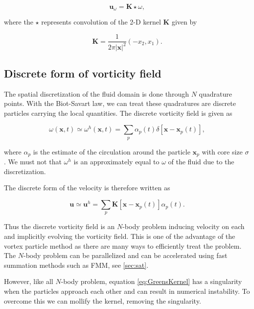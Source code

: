 	\begin{equation}
	\mathbf{u}_{\omega} = \mathbf{K}\star\omega,
	\end{equation}
	
where the $\star$ represents convolution of the 2-D kernel $\mathbf{K}$ given by

	\begin{equation}
	\mathbf{K} = \frac{1}{2\pi\left|\mathbf{x}\right|^2}\left(-x_2,x_1\right).
	\label{eq:GreensKernel}
	\end{equation}
	
\subsection{Discrete form of vorticity field}
The spatial discretization of the fluid domain is done through $N$ quadrature points. With the Biot-Savart law, we can treat these quadratures are discrete particles carrying the local quantities. The discrete vorticity field is given as

	\begin{equation}
	\omega\left(\mathbf{x},t\right) \simeq \omega^h\left(\mathbf{x},t\right) = \sum_{p}\alpha_p\left(t\right)\delta \left[\mathbf{x}-\mathbf{x}_p\left(t\right)\right],
	\end{equation}

where $\alpha_{p}$ is the estimate of the circulation around the particle $\mathbf{x}_p$ with core size $\sigma$. We must not that $\omega^h$ is an approximately equal to $\omega$ of the fluid due to the discretization.

The discrete form of the velocity is therefore written as

	\begin{equation}
	\mathbf{u} \simeq \mathbf{u}^h = \sum_p \mathbf{K}\left[\mathbf{x}-\mathbf{x}_p\left(t\right)\right]\alpha_p\left(t\right).
	\end{equation}
	
Thus the discrete vorticity field is an $N$-body problem inducing velocity on each and implicitly evolving the vorticity field. This is one of the advantage of the vortex particle method as there are many ways to efficiently treat the problem. The $N$-body problem can be parallelized and can be accelerated using fast summation methods such as FMM, see \ref{sec:sat}.
	
However, like all $N$-body problem, equation \ref{eq:GreensKernel} has a singularity when the particles approach each other and can result in numerical instability. To overcome this we can mollify the kernel, removing the singularity.

